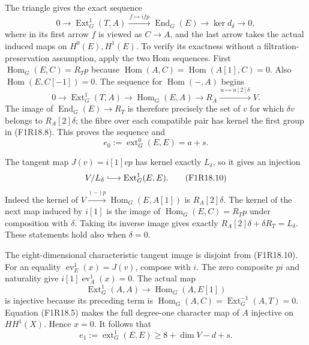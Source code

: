 The triangle gives the exact sequence
\[
 0\longrightarrow\operatorname{Ext}^1_G(T,A)
   \xrightarrow{\,f\mapsto ifp\,}\operatorname{End}_G(E)
   \longrightarrow\ker d_\delta\longrightarrow0,
 \tag{F1R18.8}
\]
where in its first arrow $f$ is viewed as $C\to A$,
and the last arrow takes the actual induced maps on
$H^0(E),H^1(E)$. To verify its exactness without a
filtration-preservation assumption, apply the two Hom
sequences. First
$\operatorname{Hom}_G(E,C)=R_Tp$ because
$\operatorname{Hom}(A,C)=\operatorname{Hom}(A[1],C)=0$.
Also $\operatorname{Hom}(E,C[-1])=0$. The sequence
for $\operatorname{Hom}(-,A)$ begins
\[
 0\longrightarrow\operatorname{Ext}^1_G(T,A)
   \longrightarrow\operatorname{Hom}_G(E,A)
   \longrightarrow R_A\xrightarrow{\,u\mapsto u[2]\delta\,}V.
\]
The image of $\operatorname{End}_G(E)\to R_T$ is
therefore precisely the set of $v$ for which
$\delta v$ belongs to $R_A[2]\delta$; the fibre over
each compatible pair has kernel the first group in
(F1R18.8). This proves the sequence and
\[
                  e_0:=\operatorname{ext}^0_G(E,E)=a+s.
 \tag{F1R18.9}
\]

The tangent map $J(v)=i[1]vp$ has kernel exactly
$L_\delta$, so it gives an injection
\[
       V/L_\delta\lhook\joinrel\longrightarrow
                              \operatorname{Ext}^1_G(E,E).
 \tag{F1R18.10}
\]
Indeed the kernel of
$V\xrightarrow{(-)p}\operatorname{Hom}_G(E,A[1])$
is $R_A[2]\delta$. The kernel of the next map induced
by $i[1]$ is the image of
$\operatorname{Hom}_G(E,C)=R_Tp$ under composition
with $\delta$. Taking its inverse image gives exactly
$R_A[2]\delta+\delta R_T=L_\delta$. These statements
hold also when $\delta=0$.

The eight-dimensional characteristic tangent image is
disjoint from (F1R18.10). For an equality
$\operatorname{ev}_E^1(x)=J(v)$, compose with $i$.
The zero composite $pi$ and naturality give
$i[1]\operatorname{ev}_A^1(x)=0$.
The actual map
\[
 \operatorname{Ext}^1_G(A,A)\longrightarrow
                    \operatorname{Hom}_G(A,E[1])
 \tag{F1R18.11}
\]
is injective because its preceding term is
$\operatorname{Hom}_G(A,C)=\operatorname{Ext}^{-1}_G(A,T)=0$.
Equation (F1R18.5) makes the full degree-one character
map of $A$ injective on $HH^1(X)$. Hence $x=0$.
It follows that
\[
 e_1:=\operatorname{ext}^1_G(E,E)
                   \ge8+\dim V-d+s.
 \tag{F1R18.12}
\]

